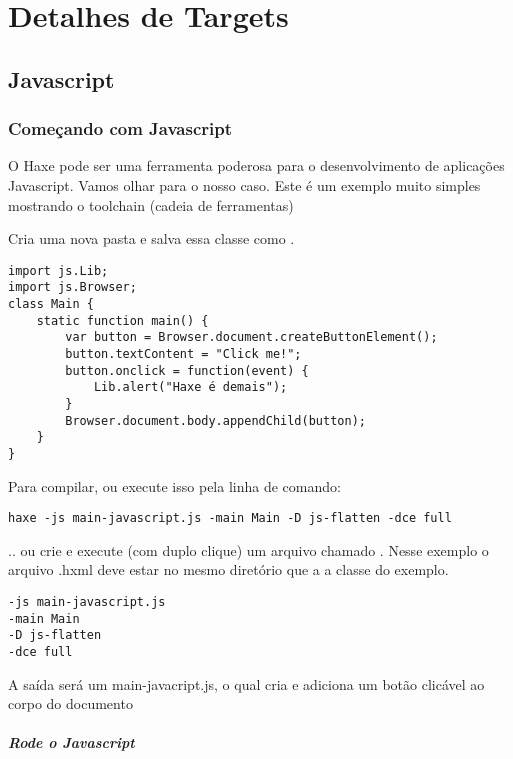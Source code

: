 \chapter{Detalhes de Targets}
\label{target-details}

\section{Javascript}
\label{target-javascript}

\subsection{Começando com Javascript}
\label{target-javascript-getting-started}

O Haxe pode ser uma ferramenta poderosa para o desenvolvimento de aplicações Javascript. Vamos olhar para o nosso caso.
Este é um exemplo muito simples mostrando o toolchain (cadeia de ferramentas)

Cria uma nova pasta e salva essa classe como .

\begin{lstlisting}
import js.Lib;
import js.Browser;
class Main {
    static function main() {
        var button = Browser.document.createButtonElement();
        button.textContent = "Click me!";
        button.onclick = function(event) {
            Lib.alert("Haxe é demais");
        }
        Browser.document.body.appendChild(button);
    }
}
\end{lstlisting}

Para compilar, ou execute isso pela linha de comando:

\begin{lstlisting}
haxe -js main-javascript.js -main Main -D js-flatten -dce full
\end{lstlisting}

.. ou crie e execute (com duplo clique) um arquivo chamado . Nesse exemplo o arquivo .hxml deve estar no mesmo diretório que a a classe do exemplo.

\begin{lstlisting}
-js main-javascript.js
-main Main
-D js-flatten
-dce full
\end{lstlisting}

A saída será um main-javacript.js, o qual cria e adiciona um botão clicável ao corpo do documento

\paragraph{Rode o Javascript}

